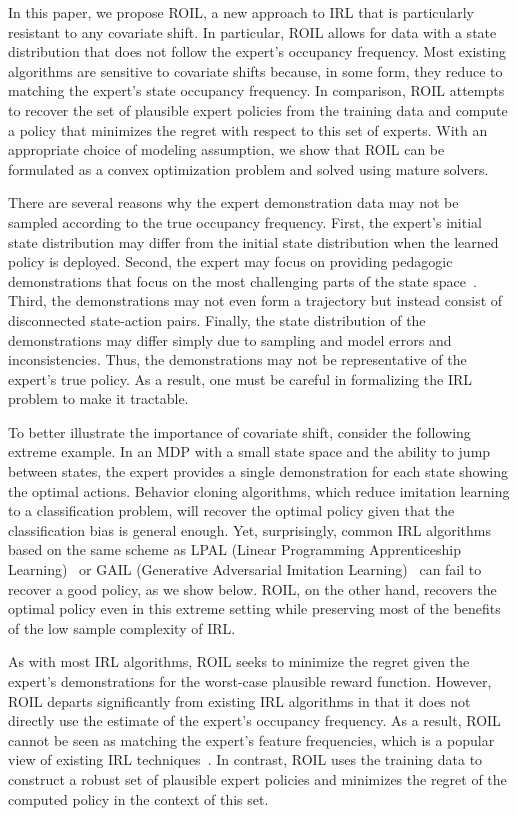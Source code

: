 \documentclass[10pt]{article}
\renewcommand{\cite}{\citep}
\theoremstyle{plain}
\theoremstyle{remark}
\newcommand{\gersi}[1]{\textcolor{red}{[#1]}}
\begin{document}
In this paper, we propose ROIL, a new approach to IRL that is particularly resistant to any covariate shift. In particular, ROIL allows for data with a state distribution that does not follow the expert's occupancy frequency. Most existing algorithms are sensitive to covariate shifts because, in some form, they reduce to matching the expert's state occupancy frequency. In comparison, ROIL attempts to recover the set of plausible expert policies from the training data and compute a policy that minimizes the regret with respect to this set of experts. With an appropriate choice of modeling assumption, we show that ROIL can be formulated as a convex optimization problem and solved using mature solvers.

There are several reasons why the expert demonstration data may not be sampled according to the true occupancy frequency. First, the expert's initial state distribution may differ from the initial state distribution when the learned policy is deployed. Second, the expert may focus on providing pedagogic demonstrations that focus on the most challenging parts of the state space~\cite{cakmak2012algorithmic,hadfield2016cooperative,Brown2018b}. Third, the demonstrations may not even form a trajectory but instead consist of disconnected state-action pairs. Finally, the state distribution of the demonstrations may differ simply due to sampling and model errors and inconsistencies. Thus, the demonstrations may not be representative of the expert's true policy. As a result, one must be careful in formalizing the IRL problem to make it tractable.

To better illustrate the importance of covariate shift, consider the following extreme example. In an MDP with a small state space and the ability to jump between states, the expert provides a single demonstration for each state showing the optimal actions. Behavior cloning algorithms, which reduce imitation learning to a classification problem, will recover the optimal policy given that the classification bias is general enough. Yet, surprisingly, common IRL algorithms based on the same scheme as LPAL (Linear Programming Apprenticeship Learning)~\cite{Syed2008} or GAIL (Generative Adversarial Imitation Learning)~\cite{Ho2016} can fail to recover a good policy, as we show below. ROIL, on the other hand, recovers the optimal policy even in this extreme setting while preserving most of the benefits of the low sample complexity of IRL. %

As with most IRL algorithms, ROIL seeks to minimize the regret given the expert's demonstrations for the worst-case plausible reward function. However, ROIL departs significantly from existing IRL algorithms in that it does not directly use the estimate of the expert's occupancy frequency. As a result, ROIL cannot be seen as matching the expert's feature frequencies, which is a popular view of existing IRL techniques~\cite{abbeel2004,Syed2008,Ho2016}. In contrast, ROIL uses the training data to construct a robust set of plausible expert policies and minimizes the regret of the computed policy in the context of this set. 
\end{document}
